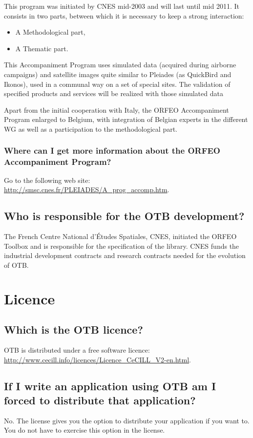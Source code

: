 This program was initiated by CNES mid-2003 and will last until mid 2011.
It consists in two parts, between which it is necessary to keep a strong interaction:
\begin{itemize}
\item A Methodological part,
\item A Thematic part.
\end{itemize}


This Accompaniment Program uses simulated data (acquired during airborne campaigns) and satellite images quite similar to Pleiades (as QuickBird and Ikonos), used in a communal way on a set of special sites. The validation of specified products and services will be realized with those simulated data

Apart from the initial cooperation with Italy, the ORFEO Accompaniment
Program enlarged to Belgium, with integration of Belgian experts in
the different WG as well as a participation to the methodological
part.

\subsubsection{Where can I get more information about the ORFEO
  Accompaniment Program?}
Go to the following web site:
\url{http://smsc.cnes.fr/PLEIADES/A_prog_accomp.htm}.

\subsection{Who is responsible for the OTB development?}
The French Centre National d'\'Etudes Spatiales, CNES, initiated the ORFEO
Toolbox and is responsible for the specification of the library. CNES
funds the industrial development contracts and research contracts
needed for the evolution of OTB.

\section{Licence}
\subsection{Which is the OTB licence?}
OTB is distributed under a free software licence:\\
\url{http://www.cecill.info/licences/Licence_CeCILL_V2-en.html}.


\subsection{If I write an application using OTB am I forced to distribute that application?}
No. The license gives you the option to distribute your application if
you want to. You do not have to exercise this option in the license.

